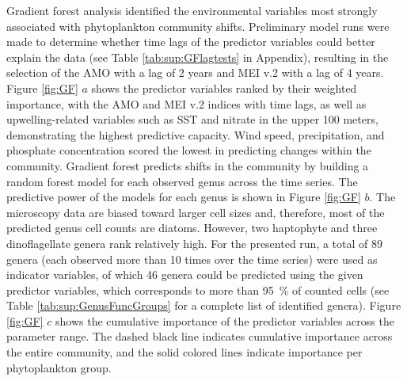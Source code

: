 \documentclass[]{agujournal2019}
\begin{document}
    Gradient forest analysis identified the environmental variables most strongly associated with phytoplankton community shifts. Preliminary model runs were made to determine whether time lags of the predictor variables could better explain the data (see Table \ref{tab:sup:GFlagtests} in Appendix), resulting in the selection of the AMO with a lag of 2 years and MEI v.2 with a lag of 4 years. Figure \ref{fig:GF} $a$ shows the predictor variables ranked by their weighted importance, with the AMO and MEI v.2 indices with time lags, as well as upwelling-related variables such as SST and nitrate in the upper 100 meters, demonstrating the highest predictive capacity. Wind speed, precipitation, and phosphate concentration scored the lowest in predicting changes within the community. 
    Gradient forest predicts shifts in the community by building a random forest model for each observed genus across the time series. The predictive power of the models for each genus is shown in Figure \ref{fig:GF} $b$. The microscopy data are biased toward larger cell sizes and, therefore, most of the predicted genus cell counts are diatoms. However, two haptophyte and three dinoflagellate genera rank relatively high. For the presented run, a total of 89 genera (each observed more than 10 times over the time series) were used as indicator variables, of which 46 genera could be predicted using the given predictor variables, which corresponds to more than \qty{95}{\%} of counted cells (see Table \ref{tab:sup:GenusFuncGroups} for a complete list of identified genera). 
    Figure \ref{fig:GF} $c$ shows the cumulative importance of the predictor variables across the parameter range. The dashed black line indicates cumulative importance across the entire community, and the solid colored lines indicate importance per phytoplankton group. 
\end{document}
